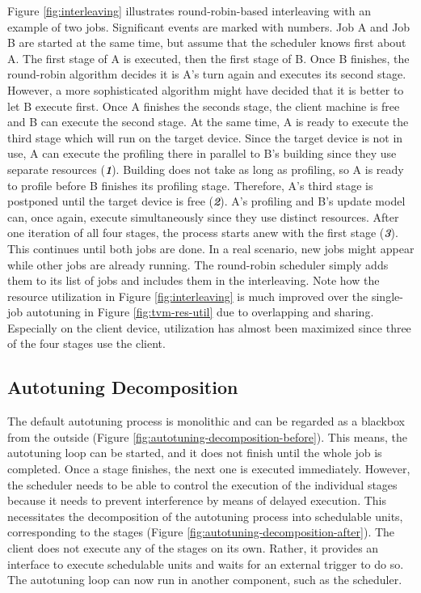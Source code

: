 Figure \ref{fig:interleaving} illustrates round-robin-based interleaving with an example of two jobs. Significant events are marked with numbers. Job A and Job B are started at the same time, but assume that the scheduler knows first about A. The first stage of A is executed, then the first stage of B. Once B finishes, the round-robin algorithm decides it is A's turn again and executes its second stage. However, a more sophisticated algorithm might have decided that it is better to let B execute first. Once A finishes the seconds stage, the client machine is free and B can execute the second stage. At the same time, A is ready to execute the third stage which will run on the target device. Since the target device is not in use, A can execute the profiling there in parallel to B's building since they use separate resources (\textbf{\textit{1}}). Building does not take as long as profiling, so A is ready to profile before B finishes its profiling stage. Therefore, A's third stage is postponed until the target device is free (\textbf{\textit{2}}). A's profiling and B's update model can, once again, execute simultaneously since they use distinct resources. After one iteration of all four stages, the process starts anew with the first stage (\textbf{\textit{3}}). This continues until both jobs are done. In a real scenario, new jobs might appear while other jobs are already running. The round-robin scheduler simply adds them to its list of jobs and includes them in the interleaving. Note how the resource utilization in Figure \ref{fig:interleaving} is much improved over the single-job autotuning in Figure \ref{fig:tvm-res-util} due to overlapping and sharing. Especially on the client device, utilization has almost been maximized since three of the four stages use the client.

\subsection{Autotuning Decomposition}
The default autotuning process is monolithic and can be regarded as a blackbox from the outside (Figure \ref{fig:autotuning-decomposition-before}). This means, the autotuning loop can be started, and it does not finish until the whole job is completed. Once a stage finishes, the next one is executed immediately. However, the scheduler needs to be able to control the execution of the individual stages because it needs to prevent interference by means of delayed execution. This necessitates the decomposition of the autotuning process into schedulable units, corresponding to the stages  (Figure \ref{fig:autotuning-decomposition-after}). The client does not execute any of the stages on its own. Rather, it provides an interface to execute schedulable units and waits for an external trigger to do so. The autotuning loop can now run in another component, such as the scheduler.

